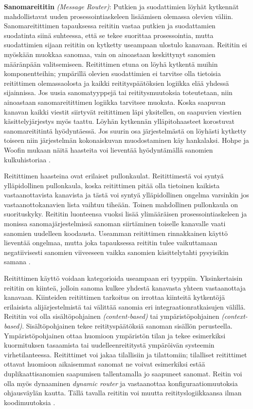    \textbf{Sanomareititin} \textit{(Message Router)}:
      Putkien ja suodattimien löyhät kytkennät mahdollistavat uuden prosessointiaskeleen lisäämisen olemassa olevien väliin. 
      Sanomareitittimen tapauksessa reititin vastaa putkien ja suodattamien suodatinta siinä suhteessa, että se tekee suorittaa prosessointia, mutta suodattimien sijaan reititin on kytketty useampaan ulostulo kanavaan. Reititin ei myöskään muokkaa sanomaa, vain on ainoastaan keskittynyt sanomien määränpään valitsemiseen.
      Reitittimen etuna on löyhä kytkentä muihin komponentteihin; ympärillä olevien suodattimien ei tarvitse olla tietoisia reitittimen olemassaolosta ja kaikki reitityspäätöksien logiikka elää yhdessä sijainnissa. Jos uusia sanomatyyppejä tai reititysmuutoksia toteutetaan, niin ainoastaan sanomareitittimen logiikka tarvitsee muokata. Koska saapuvan kanavan kaikki viestit siirtyvät reitittimen läpi yksitellen, on saapuvien viestien käsittelyjärjestys myös taattu.
      Löyhän kytkennän ylläpitohaasteet korostuvat sanomareititintä hyödyntäessä. Jos suurin osa järjestelmästä on löyhästi kytketty toiseen niin järjestelmän kokonaiskuvan muodostaminen käy hankalaksi. Hohpe ja Woofin mukaan näitä haasteita voi lieventää hyödyntämällä sanomien kulkuhistoriaa \citep[sivu~93]{Hohpe2004}.


      Reitittimen haasteina ovat erilaiset pullonkaulat. Reitittimestä voi syntyä ylläpidollinen pullonkaula, koska reitittimen pitää olla tietoinen kaikista vastaanottavista kanavista ja tästä voi syntyä ylläpidollinen ongelma varsinkin jos vastaanottokanavien lista vaihtuu tiheään. Toinen mahdollinen pullonkaula on suorituskyky. Reititin luonteensa vuoksi lisää ylimääräisen prosessointiaskeleen ja monissa sanomajärjestelmissä sanoman siirtäminen toiselle kanavalle vaati sanomien uudelleen koodausta. Useamman reitittimen rinnakkainen käyttö lieventää ongelmaa, mutta joka tapauksessa reititin tulee vaikuttamaan negatiivisesti sanomien viiveeseen vaikka sanomien käsittelytahti pysyisikin samana \citep[sivu~93]{Hohpe2004}.


      Reitittimen käyttö voidaan kategorioida useampaan eri tyyppiin. Yksinkertaisin reititin on kiinteä, jolloin sanoma kulkee yhdestä kanavasta yhteen vastaanottaja kanavaan. Kiinteiden reitittimen tarkoitus on irrottaa kiinteitä kytkentöjä erilaisista alijärjestelmistä tai välittää sanomia eri integraationratkaisujen välillä.
      Reititin voi olla sisältöpohjainen \textit{(content-based)} tai ympäristöpohjainen \textit{(context-based)}. Sisältöpohjainen tekee reitityspäätöksiä sanoman sisällön perusteella. Ympäristöpohjainen ottaa huomioon ympäristön tilan ja tekee esimerkiksi kuormituksen tasaamista tai uudelleenreititystä ympäröivän systeemin virhetilanteessa.
      Reitittimet voi jakaa tilallisiin ja tilattomiin; tilalliset reitittimet ottavat huomioon aikaisemmat sanomat ne voivat esimerkiksi estää duplikaattisanomien saapumisen tallentamalla jo saapuneet sanomat.
      Reitin voi olla myös dynaaminen \textit{dynamic router} ja vastaanottaa konfiguraatiomuutoksia ohjausväylän kautta. Tällä tavalla reititin voi muutta reitityslogiikkaansa ilman koodimuutoksia \citep[sivu~94]{Hohpe2004}.


